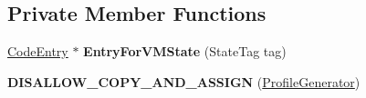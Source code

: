 \subsection*{Private Member Functions}
\begin{DoxyCompactItemize}
\item 
\hyperlink{classv8_1_1internal_1_1_code_entry}{Code\+Entry} $\ast$ {\bfseries Entry\+For\+V\+M\+State} (State\+Tag tag)\hypertarget{classv8_1_1internal_1_1_profile_generator_a050c96a410706d601429ee789788a000}{}\label{classv8_1_1internal_1_1_profile_generator_a050c96a410706d601429ee789788a000}

\item 
{\bfseries D\+I\+S\+A\+L\+L\+O\+W\+\_\+\+C\+O\+P\+Y\+\_\+\+A\+N\+D\+\_\+\+A\+S\+S\+I\+GN} (\hyperlink{classv8_1_1internal_1_1_profile_generator}{Profile\+Generator})\hypertarget{classv8_1_1internal_1_1_profile_generator_aa68a4247e36628264e1dc0894a002ced}{}\label{classv8_1_1internal_1_1_profile_generator_aa68a4247e36628264e1dc0894a002ced}

\end{DoxyCompactItemize}
